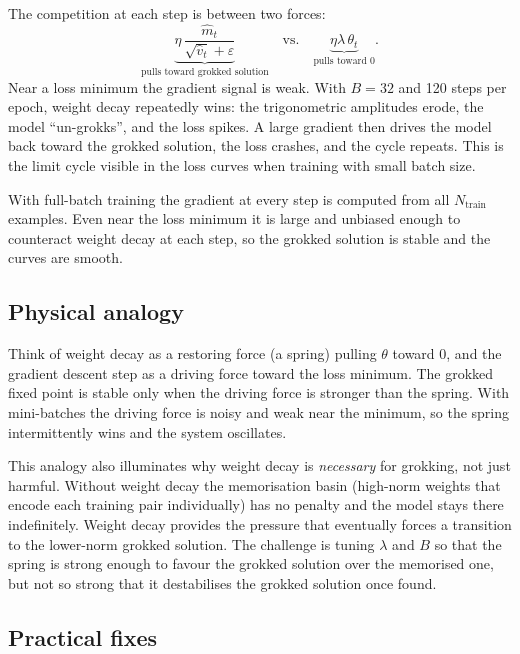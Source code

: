 \documentclass[11pt]{article}
\begin{document}
The competition at each step is between two forces:
\begin{equation}
    \underbrace{\eta\,\frac{\hat{m}_t}{\sqrt{\hat{v}_t}+\varepsilon}}
    _{\text{pulls toward grokked solution}}
    \quad \text{vs.} \quad
    \underbrace{\eta\lambda\,\theta_t}_{\text{pulls toward }0}.
\end{equation}
Near a loss minimum the gradient signal is weak.  With $B=32$ and 120
steps per epoch, weight decay repeatedly wins: the trigonometric amplitudes
erode, the model ``un-grokks'', and the loss spikes.  A large gradient then
drives the model back toward the grokked solution, the loss crashes, and the
cycle repeats.  This is the limit cycle visible in the loss curves when
training with small batch size.

With full-batch training the gradient at every step is computed from all
$N_{\mathrm{train}}$ examples.  Even near the loss minimum it is large and
unbiased enough to counteract weight decay at each step, so the grokked
solution is stable and the curves are smooth.

\subsection{Physical analogy}

Think of weight decay as a restoring force (a spring) pulling $\theta$
toward $0$, and the gradient descent step as a driving force toward the loss
minimum.  The grokked fixed point is stable only when the driving force is
stronger than the spring.  With mini-batches the driving force is noisy and
weak near the minimum, so the spring intermittently wins and the system
oscillates.

This analogy also illuminates why weight decay is \emph{necessary} for
grokking, not just harmful.  Without weight decay the memorisation basin
(high-norm weights that encode each training pair individually) has no penalty
and the model stays there indefinitely.  Weight decay provides the pressure
that eventually forces a transition to the lower-norm grokked solution.  The
challenge is tuning $\lambda$ and $B$ so that the spring is strong enough to
favour the grokked solution over the memorised one, but not so strong that it
destabilises the grokked solution once found.

\subsection{Practical fixes}
\end{document}
